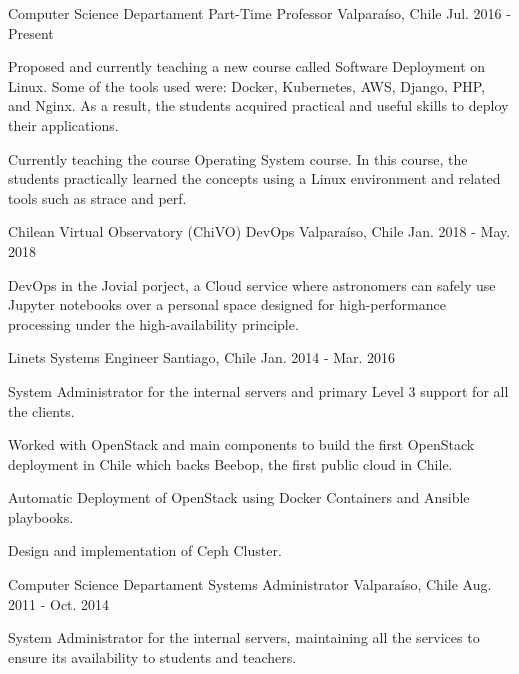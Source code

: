 \begin{cventries}
  \cventry
    {Computer Science Departament}
    {Part-Time Professor}
    {Valparaíso, Chile}
    {Jul. 2016 - Present}
    {
      \begin{cvitems}
        \item {Proposed and currently teaching a new course called Software Deployment on Linux. Some of the tools used were: Docker, Kubernetes, AWS, Django, PHP,  and Nginx. As a result, the students acquired practical and useful skills to deploy their applications.}
        \item {Currently teaching the course Operating System course. In this course, the students practically learned the concepts using a Linux environment and related tools such as strace and perf.}
      \end{cvitems}
    }
    
    
  \cventry
    {Chilean Virtual Observatory (ChiVO)}
    {DevOps}
    {Valparaíso, Chile}
    {Jan. 2018 - May. 2018}
    {
      \begin{cvitems}
        \item {DevOps in the Jovial porject, a Cloud service where astronomers can safely use Jupyter notebooks over a personal space designed for high-performance processing under the high-availability principle.}
      \end{cvitems}
    }
    

  \cventry
    {Linets}
    {Systems Engineer}    
    {Santiago, Chile}
    {Jan. 2014 - Mar. 2016}
    {
      \begin{cvitems}
        \item {System Administrator for the internal servers and primary Level 3 support for all the clients.}
        \item {Worked with OpenStack and main components to build the first OpenStack deployment in Chile which backs Beebop, the first public cloud in Chile.}
        \item {Automatic Deployment of OpenStack using Docker Containers and Ansible playbooks.}
        \item {Design and implementation of Ceph Cluster.}
      \end{cvitems}
    }
    
  \cventry
    {Computer Science Departament}
    {Systems Administrator}    
    {Valparaíso, Chile}
    {Aug. 2011 - Oct. 2014}
    {
      \begin{cvitems}
		\item{System Administrator for the internal servers, maintaining all the services to ensure its availability to students and teachers.}
      \end{cvitems}
    }    
\end{cventries}

